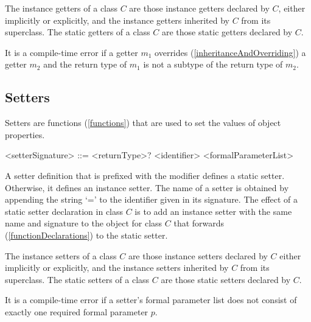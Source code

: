 \documentclass[makeidx]{article}
\begin{document}
\LMHash{}%
The instance getters of a class $C$ are those instance getters declared by $C$, either implicitly or explicitly, and the instance getters inherited by $C$ from its superclass.
The static getters of a class $C$ are those static getters declared by $C$.


\LMHash{}%
It is a compile-time error if a getter $m_1$ overrides (\ref{inheritanceAndOverriding}) a getter $m_2$
and the return type of $m_1$ is not a subtype of the return type of $m_2$.


\subsection{Setters}

\LMHash{}%
Setters are functions (\ref{functions}) that are used to set the values of object properties.

\begin{grammar}
<setterSignature> ::= <returnType>? \SET{} <identifier> <formalParameterList>
\end{grammar}


\LMHash{}%
A setter definition that is prefixed with the \STATIC{} modifier defines a static setter.
Otherwise, it defines an instance setter.
The name of a setter is obtained by appending the string `=' to the identifier given in its signature.
The effect of a static setter declaration in class $C$ is to add an instance setter with the same name and signature to the  object for class $C$ that forwards (\ref{functionDeclarations}) to the static setter.


\LMHash{}%
The instance setters of a class $C$ are those instance setters declared by $C$ either implicitly or explicitly, and the instance setters inherited by $C$ from its superclass.
The static setters of a class $C$ are those static setters declared by $C$.

\LMHash{}%
It is a compile-time error if a setter's formal parameter list does not consist of exactly one required formal parameter $p$.
\end{document}
